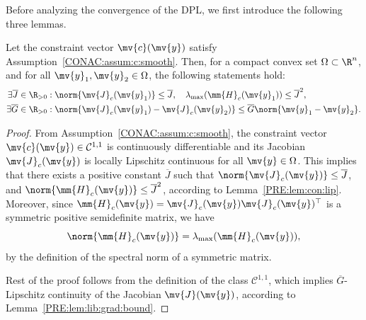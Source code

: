 Before analyzing the convergence of the DPL, we first introduce the following three lemmas.

\begin{lem}
  \label{CONAC:lem:proj:c:Lipschitz}
  Let the constraint vector $\mv{c}(\mv{y})$ satisfy Assumption~\ref{CONAC:assum:c:smooth}.
  Then, for a compact convex set $\Omega\subset\R^{n}$, and for all $\mv{y}_1,\mv{y}_2\in\Omega$, the following statements hold: 
  \begin{align}
    \label{CONAC:eq:proj:lem:c:Lipschitz}
    \exists \overline{J}\in\R_{>0}
    &
    :
    \norm{\mv{J}_c(\mv{y}_1)}
    \le
    \overline{J}
    ,\quad
    \lambda_{\max}
    (
      \mm{H}_c(\mv{y}_1)
    )
    \le
    \overline{J}^2
    ,
    \\
    \exists \overline{G}\in\R_{>0}
    &
    :
    \norm{\mv{J}_c(\mv{y}_1) - \mv{J}_c(\mv{y}_2)}
    \le
    \overline{G}\norm{\mv{y}_1-\mv{y}_2}
    .
  \end{align}
\end{lem}

\begin{proof}
  
  From Assumption~\ref{CONAC:assum:c:smooth}, the constraint vector $\mv{c}(\mv{y})\in\mathcal{C}^{1,1}$ is continuously differentiable and its Jacobian $\mv{J}_c(\mv{y})$ is locally Lipschitz continuous for all $\mv{y}\in\Omega$.
  This implies that there exists a positive constant $\overline{J}$ such that $\norm{\mv{J}_c(\mv{y})}\le\overline{J}$, and $\norm{\mm{H}_c(\mv{y})}\le\overline{J}^2$, according to Lemma~\ref{PRE:lem:con:lip}.
  Moreover, since $\mm{H}_c(\mv{y}) = \mv{J}_c(\mv{y})\mv{J}_c(\mv{y})^\top$ is a symmetric positive semidefinite matrix, we have
  \begin{equation}
    \norm{\mm{H}_c(\mv{y})}
    =
    \lambda_{\max}
    (
      \mm{H}_c(\mv{y})
    )
    ,
  \end{equation}
  by the definition of the spectral norm of a symmetric matrix.

  Rest of the proof follows from the definition of the class $\mathcal{C}^{1,1}$, which implies $\overline{G}$-Lipschitz continuity of the Jacobian $\mv{J}(\mv{y})$, according to Lemma~\ref{PRE:lem:lib:grad:bound}.

\end{proof}

